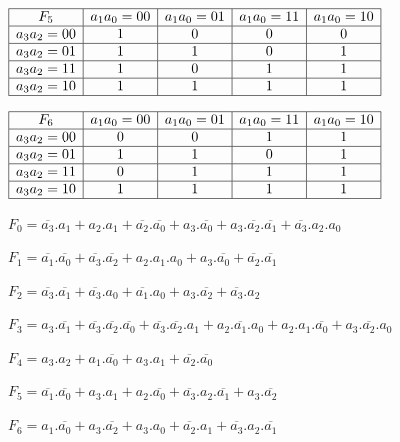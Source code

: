 \begin{center}
$\begin{array}{|c|c|c|c|c|}
\hline
F_5 & a_1a_0=00 & a_1a_0=01 & a_1a_0=11 & a_1a_0=10 \\
\hline
a_3a_2=00  & 1   &  0  &  0  &  0  \\
\hline
a_3a_2=01  &  1  &  1  &  0  &  1  \\
\hline
a_3a_2=11  &  1  &  0  &  1  &  1  \\
\hline
a_3a_2=10  &  1  &  1  & 1   &  1  \\
\hline
\end{array}$
\end{center}

\begin{center}
$\begin{array}{|c|c|c|c|c|}
\hline
F_6 & a_1a_0=00 & a_1a_0=01 & a_1a_0=11 & a_1a_0=10 \\
\hline
a_3a_2=00  & 0   &  0  &  1  &  1  \\
\hline
a_3a_2=01  &  1  &  1  &  0  & 1   \\
\hline
a_3a_2=11  &  0  &  1  &  1  & 1   \\
\hline
a_3a_2=10  &  1  &  1  &  1  & 1   \\
\hline
\end{array}$
\end{center}


$F_0=\overline{a_3}.a_1+a_2.a_1+\overline{a_2}.\overline{a_0}+a_3.\overline{a_0}+a_3.\overline{a_2}.\overline{a_1}+\overline{a_3}.a_2.a_0$

$F_1=\overline{a_1}.\overline{a_0}+\overline{a_3}.\overline{a_2}+a_2.a_1.a_0+a_3.\overline{a_0}+\overline{a_2}.\overline{a_1}$

$F_2=\overline{a_3}.\overline{a_1}+\overline{a_3}.a_0+\overline{a_1}.a_0+a_3.\overline{a_2}+\overline{a_3}.a_2$

$F_3=a_3.\overline{a_1}+\overline{a_3}.\overline{a_2}.\overline{a_0}+\overline{a_3}.\overline{a_2}.a_1+a_2.\overline{a_1}.a_0+a_2.a_1.\overline{a_0}+a_3.\overline{a_2}.a_0$

$F_4=a_3.a_2+a_1.\overline{a_0}+a_3.a_1+\overline{a_2}.\overline{a_0}$

$F_5=\overline{a_1}.\overline{a_0}+a_3.a_1+a_2.\overline{a_0}+\overline{a_3}.a_2.\overline{a_1}+a_3.\overline{a_2}$

$F_6=a_1.\overline{a_0}+a_3.\overline{a_2}+a_3.a_0+\overline{a_2}.a_1+\overline{a_3}.a_2.\overline{a_1}$


